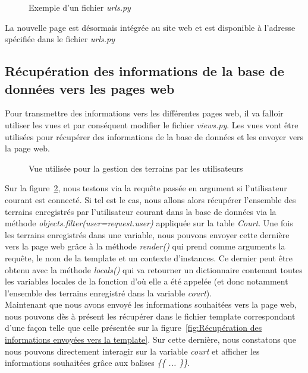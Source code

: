 \begin{figure}[!ht]
\centering

\caption{Exemple d'un fichier \textit{urls.py}}
\label{fig:Exemple d'un fichier urls.py}
\end{figure}
\FloatBarrier


La nouvelle page est désormais intégrée au site web et est disponible à l'adresse spécifiée dans le fichier \textit{urls.py}

\subsection{Récupération des informations de la base de données vers les pages web}

Pour transmettre des informations vers les différentes pages web, il va falloir utiliser les vues et par conséquent modifier le fichier \textit{views.py}. Les vues vont être utilisées pour récupérer des informations de la base de données et les envoyer vers la page web.

\begin{figure}[!ht]
\centering

\caption{Vue utilisée pour la gestion des terrains par les utilisateurs}
\label{fig:Vue utilisée pour la gestion des terrains par les utilisateurs}
\end{figure}
\FloatBarrier

Sur la figure~\ref{fig:Vue utilisée pour la gestion des terrains par les utilisateurs}, nous testons via la requête passée en argument si l'utilisateur courant est connecté. Si tel est le cas, nous allons alors récupérer l'ensemble des terrains enregistrés par l'utilisateur courant dans la base de données via la méthode \textit{objects.filter(user=request.user)} appliquée sur la table \textit{Court}. Une fois les terrains enregistrés dans une variable, nous pouvons envoyer cette dernière vers la page web grâce à la méthode \textit{render()} qui prend comme arguments la requête, le nom de la template et un contexte d'instances. Ce dernier peut être obtenu avec la méthode \textit{locals()} qui va retourner un dictionnaire contenant toutes les variables locales de la fonction d'où elle a été appelée (et donc notamment l'ensemble des terrains enregistré dans la variable \textit{court}).\\

Maintenant que nous avons envoyé les informations souhaitées vers la page web, nous pouvons dès à présent les récupérer dans le fichier template correspondant d'une façon telle que celle présentée sur la figure~\ref{fig:Récupération des informations envoyées vers la template}. Sur cette dernière, nous constatons que nous pouvons directement interagir sur la variable \textit{court} et afficher les informations souhaitées grâce aux balises \textit{\{\{ ... \}\}}.

